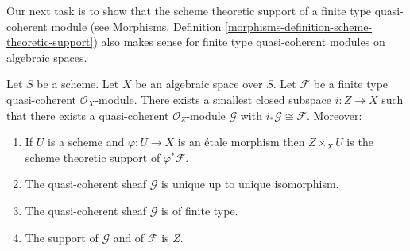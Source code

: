 \noindent
Our next task is to show that the scheme theoretic support
of a finite type quasi-coherent module (see
Morphisms, Definition \ref{morphisms-definition-scheme-theoretic-support})
also makes sense for finite type quasi-coherent modules on
algebraic spaces.

\begin{lemma}
\label{lemma-scheme-theoretic-support}
Let $S$ be a scheme. Let $X$ be an algebraic space over $S$.
Let $\mathcal{F}$ be a finite type quasi-coherent $\mathcal{O}_X$-module.
There exists a smallest closed subspace $i : Z \to X$ such that there
exists a quasi-coherent $\mathcal{O}_Z$-module $\mathcal{G}$ with
$i_*\mathcal{G} \cong \mathcal{F}$. Moreover:
\begin{enumerate}
\item If $U$ is a scheme and $\varphi : U \to X$ is an \'etale morphism
then $Z \times_X U$ is the scheme theoretic support of $\varphi^*\mathcal{F}$.
\item The quasi-coherent sheaf $\mathcal{G}$ is unique up to unique
isomorphism.
\item The quasi-coherent sheaf $\mathcal{G}$ is of finite type.
\item The support of $\mathcal{G}$ and of $\mathcal{F}$ is $Z$.
\end{enumerate}
\end{lemma}

